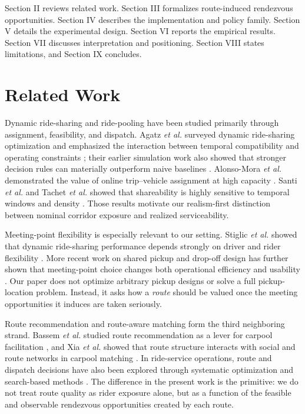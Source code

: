 \documentclass[journal]{IEEEtran}
\begin{document}
Section II reviews related work. Section III formalizes route-induced rendezvous opportunities. Section IV describes the implementation and policy family. Section V details the experimental design. Section VI reports the empirical results. Section VII discusses interpretation and positioning. Section VIII states limitations, and Section IX concludes.
\section{Related Work}
Dynamic ride-sharing and ride-pooling have been studied primarily through assignment, feasibility, and dispatch. Agatz \emph{et al.} surveyed dynamic ride-sharing optimization and emphasized the interaction between temporal compatibility and operating constraints \cite{agatz2012}; their earlier simulation work also showed that stronger decision rules can materially outperform naive baselines \cite{agatz2011}. Alonso-Mora \emph{et al.} demonstrated the value of online trip--vehicle assignment at high capacity \cite{alonso2017}. Santi \emph{et al.} and Tachet \emph{et al.} showed that shareability is highly sensitive to temporal windows and density \cite{santi2014,tachet2017}. Those results motivate our realism-first distinction between nominal corridor exposure and realized serviceability.

Meeting-point flexibility is especially relevant to our setting. Stiglic \emph{et al.} showed that dynamic ride-sharing performance depends strongly on driver and rider flexibility \cite{stiglic2016}. More recent work on shared pickup and drop-off design has further shown that meeting-point choice changes both operational efficiency and usability \cite{stumpe2024,zhou2026}. Our paper does not optimize arbitrary pickup designs or solve a full pickup-location problem. Instead, it asks how a \emph{route} should be valued once the meeting opportunities it induces are taken seriously.

Route recommendation and route-aware matching form the third neighboring strand. Bassem \emph{et al.} studied route recommendation as a lever for carpool facilitation \cite{bassem2022}, and Xia \emph{et al.} showed that route structure interacts with social and route networks in carpool matching \cite{xia2019}. In ride-service operations, route and dispatch decisions have also been explored through systematic optimization and search-based methods \cite{chen2021}. The difference in the present work is the primitive: we do not treat route quality as rider exposure alone, but as a function of the feasible and observable rendezvous opportunities created by each route.
\end{document}
